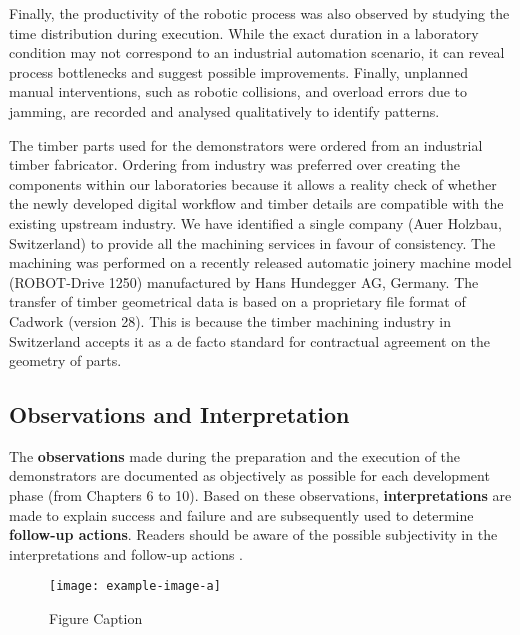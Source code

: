 Finally, the productivity of the robotic process was also observed by studying the time distribution during execution. While the exact duration in a laboratory condition may not correspond to an industrial automation scenario, it can reveal process bottlenecks and suggest possible improvements. Finally, unplanned manual interventions, such as robotic collisions, and overload errors due to jamming, are recorded and analysed qualitatively to identify patterns.

The timber parts used for the demonstrators were ordered from an industrial timber fabricator. Ordering from industry was preferred over creating the components within our laboratories because it allows a reality check of whether the newly developed digital workflow and timber details are compatible with the existing upstream industry. We have identified a single company (Auer Holzbau, Switzerland) to provide all the machining services in favour of consistency. The machining was performed on a recently released automatic joinery machine model (ROBOT-Drive 1250) manufactured by Hans Hundegger AG, Germany. The transfer of timber geometrical data is based on a proprietary file format of Cadwork (version 28). This is because the timber machining industry in Switzerland accepts it as a de facto standard for contractual agreement on the geometry of parts.

\subsection{Observations and Interpretation}
\label{subsection:methodology_observations_and_interpretation}

The \textbf{observations }made during the preparation and the execution of the demonstrators are documented as objectively as possible for each development phase (from Chapters 6 to 10). Based on these observations, \textbf{interpretations }are made to explain success and failure and are subsequently used to determine \textbf{follow-up actions}. Readers should be aware of the possible subjectivity in the interpretations and follow-up actions . 

\begin{figure}
    \centering
    \texttt{[image: example-image-a]}
    \caption{Figure Caption}
\end{figure}

